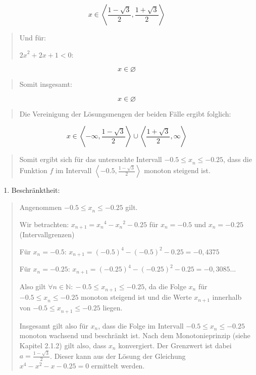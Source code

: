 \documentclass[a4paper, 12pt]{book}
\begin{document}
\[x \in \left\langle \frac{1 - \sqrt{3}}{2},\frac{1 + \sqrt{3}}{2} \right\rangle\]

\begin{quote}
Und für:

\({2x}^{2} + 2x + 1 < 0\):
\end{quote}

\[x \in \varnothing\]

\begin{quote}
Somit insgesamt:
\end{quote}

\[x \in \varnothing\]

\begin{quote}
Die Vereinigung der Lösungsmengen der beiden Fälle ergibt folglich:
\end{quote}

\[x \in \left\langle  - \infty,\frac{1 - \sqrt{3}}{2} \right\rangle \cup \left\langle \frac{1 + \sqrt{3}}{2},\infty \right\rangle\]

\begin{quote}
Somit ergibt sich für das untersuchte Intervall
\(- 0.5{\leq x}_{n} \leq  - 0.25\), dass die Funktion \(f\) im
Intervall
\(\left\langle - 0.5,\frac{1 - \sqrt{3}}{2} \right\rangle\)
monoton steigend ist.
\end{quote}

\begin{enumerate}
\def\labelenumi{\arabic{enumi})}
\setcounter{enumi}{1}
\item
  Beschränktheit:
\end{enumerate}

\begin{quote}
Angenommen \(- 0.5{\leq x}_{n} \leq  - 0.25\) gilt.

Wir betrachten:
\(x_{n + 1} = {x_{n}}^{4} - {x_{n}}^{2} - 0.25\) für
\(x_{n} =  - 0.5\) und \(x_{n} =  - 0.25\) (Intervallgrenzen)

Für \(x_{n} =  - 0.5\):
\(x_{n + 1} = {( - 0.5)}^{4} - {( - 0.5)}^{2} - 0.25 =  - 0,4375\)

Für \(x_{n} =  - 0.25\):
\(x_{n + 1} = {( - 0.25)}^{4} - {( - 0.25)}^{2} - 0.25 =  - 0,3085...\)

Also gilt
\(\forall n \in \mathbb{N:} - 0.5{\leq x}_{n + 1} \leq  - 0.25\),
da die Folge \(x_{n}\) für
\(- 0.5{\leq x}_{n} \leq  - 0.25\) monoton steigend ist und
die Werte \({x}_{n + 1}\) innerhalb von
\(- 0.5{\leq x}_{n + 1} \leq  - 0.25\) liegen.

Insgesamt gilt also für \(x_{n}\), dass die Folge im Intervall
\(- 0.5{\leq x}_{n} \leq  - 0.25\) monoton wachsend und
beschränkt ist. Nach dem Monotonieprinzip (siehe Kapitel 2.1.2) gilt
also, dass \(x_{n}\) konvergiert. Der Grenzwert ist dabei
\(a = \frac{1 - \sqrt{3}}{2}\). Dieser kann aus der Lösung der
Gleichung \(x^{4} - x^{2} - x - 0.25 = 0\) ermittelt
werden.
\end{quote}
\end{document}
